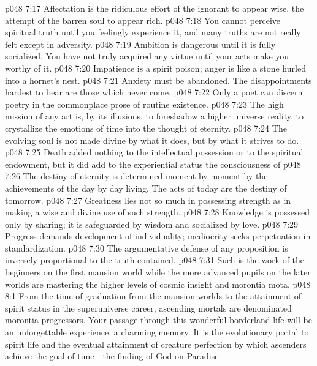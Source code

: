 \pc \vs p048 7:17 \bibnobreakspace Affectation is the ridiculous effort of the ignorant to appear wise, the attempt of the barren soul to appear rich.\plusone
\pc \vs p048 7:18 \bibnobreakspace You cannot perceive spiritual truth until you feelingly experience it, and many truths are not really felt except in adversity.\plusone
\pc \vs p048 7:19 \bibnobreakspace Ambition is dangerous until it is fully socialized. You have not truly acquired any virtue until your acts make you worthy of it.\plusone
\pc \vs p048 7:20 \bibnobreakspace Impatience is a spirit poison; anger is like a stone hurled into a hornet’s nest.
\pc \vs p048 7:21 \bibnobreakspace Anxiety must be abandoned. The disappointments hardest to bear are those which never come.
\pc \vs p048 7:22 \bibnobreakspace Only a poet can discern poetry in the commonplace prose of routine existence.
\pc \vs p048 7:23 \bibnobreakspace The high mission of any art is, by its illusions, to foreshadow a higher universe reality, to crystallize the emotions of time into the thought of eternity.\plusone
\pc \vs p048 7:24 \bibnobreakspace The evolving soul is not made divine by what it does, but by what it strives to do.\plusone
\pc \vs p048 7:25 \bibnobreakspace Death added nothing to the intellectual possession or to the spiritual endowment, but it did add to the experiential status the consciousness of \plusone
\pc \vs p048 7:26 \bibnobreakspace The destiny of eternity is determined moment by moment by the achievements of the day by day living. The acts of today are the destiny of tomorrow.\plusone
\pc \vs p048 7:27 \bibnobreakspace Greatness lies not so much in possessing strength as in making a wise and divine use of such strength.
\pc \vs p048 7:28 \bibnobreakspace Knowledge is possessed only by sharing; it is safeguarded by wisdom and socialized by love.
\pc \vs p048 7:29 \bibnobreakspace Progress demands development of individuality; mediocrity seeks perpetuation in standardization.
\pc \vs p048 7:30 \bibnobreakspace The argumentative defense of any proposition is inversely proportional to the truth contained.
\pc \vs p048 7:31 Such is the work of the beginners on the first mansion world while the more advanced pupils on the later worlds are mastering the higher levels of cosmic insight and morontia mota.\plusone
{}
\vs p048 8:1 From the time of graduation from the mansion worlds to the attainment of spirit status in the superuniverse career, ascending mortals are denominated morontia progressors. Your passage through this wonderful borderland life will be an unforgettable experience, a charming memory. It is the evolutionary portal to spirit life and the eventual attainment of creature perfection by which ascenders achieve the goal of time---the finding of God on Paradise.
